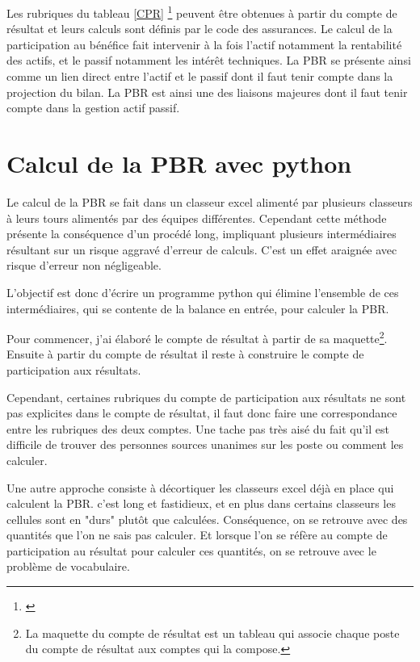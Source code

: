 Les rubriques du tableau \ref{CPR} \footnote{\cite{Befec-PriceWaterhouse1996}} peuvent être obtenues à partir du compte de résultat et leurs calculs sont définis par le code des assurances.
Le calcul de la participation au bénéfice fait intervenir à la fois l'actif notamment la rentabilité des actifs, et le passif notamment les intérêt techniques. La PBR se présente ainsi comme un lien direct entre l'actif et le passif dont il faut tenir compte dans la projection du bilan. La PBR est ainsi une des liaisons majeures dont il faut tenir compte dans la gestion actif passif.

\section{Calcul de la PBR avec python}

Le calcul de la PBR se fait dans un classeur excel alimenté par plusieurs classeurs à leurs tours alimentés par des équipes différentes. Cependant cette méthode présente la conséquence d'un procédé long, impliquant plusieurs intermédiaires résultant sur un  risque aggravé d'erreur de calculs. C'est un effet araignée avec risque d'erreur non négligeable.

L'objectif est donc d'écrire un programme python qui élimine l'ensemble de ces intermédiaires, qui se contente de la balance en entrée, pour calculer la PBR.

Pour commencer, j'ai élaboré le compte de résultat à partir de sa maquette\footnote{La maquette du compte de résultat est un tableau qui associe chaque poste du compte de résultat aux comptes qui la compose.}. 
Ensuite à partir du compte de résultat il reste à construire le compte de participation aux résultats.

Cependant, certaines rubriques du compte de participation aux résultats ne sont pas explicites dans le compte de résultat, il faut donc faire une correspondance entre les rubriques des deux comptes. Une tache pas très aisé du fait qu'il est difficile de trouver des personnes sources unanimes sur les poste ou comment les calculer.

Une autre approche consiste à décortiquer les classeurs excel déjà en place qui calculent la PBR. c'est long et fastidieux, et en plus dans certains classeurs les cellules sont en "durs" plutôt que calculées. Conséquence, on se retrouve avec des quantités que l'on ne sais pas calculer. Et lorsque l'on se réfère au compte de participation au résultat pour calculer ces quantités, on se retrouve avec le problème de vocabulaire.

